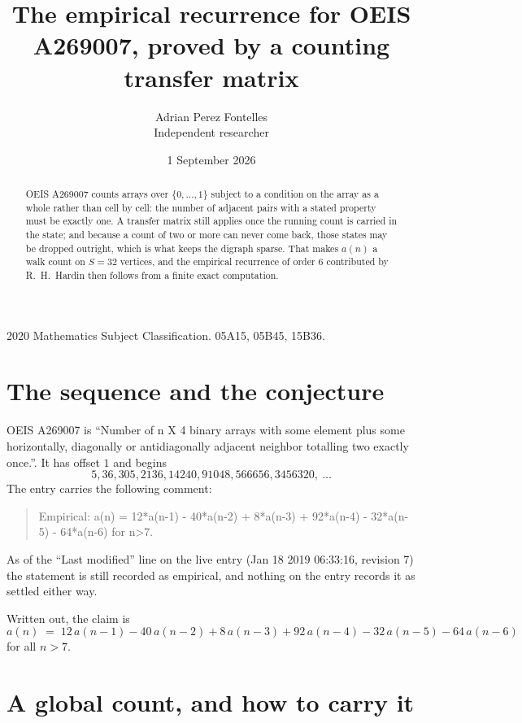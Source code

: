 \documentclass[11pt,a4paper]{article}
\title{The empirical recurrence for OEIS A269007, proved by a counting transfer matrix}
\author{Adrian Perez Fontelles\\ \small Independent researcher}
\date{1 September 2026}
\theoremstyle{plain}
\theoremstyle{definition}
\begin{document}
\maketitle

\begin{abstract}
OEIS A269007 counts arrays over $\{0,\dots,1\}$ subject to a condition on the array as a
whole rather than cell by cell: the number of adjacent pairs with a stated property must be
exactly one. A transfer matrix still applies once the running count is carried in the state; and
because a count of two or more can never come back, those states may be dropped outright,
which is what keeps the digraph sparse. That makes $a(n)$ a walk count on $S=32$ vertices,
and the empirical recurrence of order $6$ contributed by R.~H.~Hardin then follows from
a finite exact computation.
\end{abstract}

\noindent\small 2020 Mathematics Subject Classification. 05A15, 05B45, 15B36.\normalsize

\section{The sequence and the conjecture}

OEIS A269007 is ``Number of n X 4 binary arrays with some element plus some horizontally, diagonally or antidiagonally adjacent neighbor totalling two exactly once.''. It has offset $1$ and begins
\[
5, 36, 305, 2136, 14240, 91048, 566656, 3456320,\ \dots
\]
The entry carries the following comment:
\begin{quote}\small
Empirical: a(n) = 12*a(n-1) - 40*a(n-2) + 8*a(n-3) + 92*a(n-4) - 32*a(n-5) - 64*a(n-6) for n>7.
\end{quote}
As of the ``Last modified'' line on the live entry (Jan 18 2019 06:33:16, revision 7) the statement is
still recorded as empirical, and nothing on the entry records it as settled either way.

Written out, the claim is
\begin{equation}\label{eq:conj}
a(n)\;=\;12\,a(n-1) - 40\,a(n-2) + 8\,a(n-3) + 92\,a(n-4) - 32\,a(n-5) - 64\,a(n-6)
\end{equation}
for all $n>7$.

\section{A global count, and how to carry it}
\end{document}
